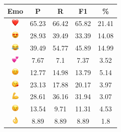 \documentclass{article}
\begin{document}
\begin{table}
\centering
\begin{tabular}{|c|ccc|c|} \hline
\textbf{Emo} & \textbf{P} & \textbf{R} & \textbf{F1} & \textbf{\%} \\ \hline
\includegraphics[height=0.37cm,width=0.37cm]{img/red_heart.png} & 65.23 & 66.42 & 65.82 & 21.41\\ 
\includegraphics[height=0.37cm,width=0.37cm]{img/smiling_face_with_hearteyes.png} & 28.93 & 39.49 & 33.39 & 14.08\\ 
\includegraphics[height=0.37cm,width=0.37cm]{img/face_with_tears_of_joy.png} & 39.49 & 54.77 & 45.89 & 14.99\\ 
\includegraphics[height=0.37cm,width=0.37cm]{img/two_hearts.png} & 7.67 & 7.1 & 7.37 & 3.52\\ 
\includegraphics[height=0.37cm,width=0.37cm]{img/smiling_face_with_smiling_eyes.png} & 12.77 & 14.98 & 13.79 & 5.14\\ 
\includegraphics[height=0.37cm,width=0.37cm]{img/face_blowing_a_kiss.png} & 23.13 & 17.88 & 20.17 & 3.97\\ 
\includegraphics[height=0.37cm,width=0.37cm]{img/flexed_biceps.png} & 28.61 & 36.16 & 31.94 & 3.07\\ 
\includegraphics[height=0.37cm,width=0.37cm]{img/winking_face.png} & 13.54 & 9.71 & 11.31 & 4.53\\ 
\includegraphics[height=0.37cm,width=0.37cm]{img/OK_hand.png} & 8.89 & 8.89 & 8.89 & 1.8\\ 

\end{tabular}
\end{table}
\end{document}
